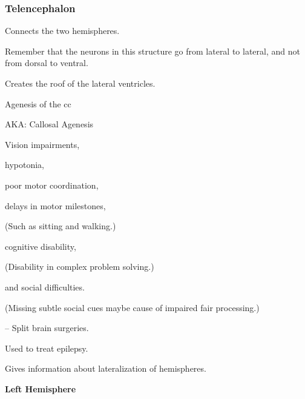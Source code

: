 \begin{coloredlist}
    \subsubsection{Telencephalon}
    \item {}
    \begin{coloredlist}
        \item Connects the two hemispheres.
        \item Remember that the neurons in this structure go from lateral to lateral, and not from dorsal to ventral.
        \item Creates the roof of the lateral ventricles.
        \item Agenesis of the cc
        \begin{coloredlist}
            \item AKA: Callosal Agenesis
            \item Vision impairments,
            \item hypotonia,
            \item poor motor coordination,
            \item delays in motor milestones,
            \begin{coloredlist}
                \item (Such as sitting and walking.)
            \end{coloredlist}
            \item cognitive disability,
            \begin{coloredlist}
                \item (Disability in complex problem solving.)
            \end{coloredlist}
            \item and social difficulties.
            \begin{coloredlist}
                \item (Missing subtle social cues maybe cause of impaired fair processing.)
            \end{coloredlist}
        \end{coloredlist}
        \item {} -- Split brain surgeries.
        \begin{coloredlist}
            \item Used to treat epilepsy.
            \item Gives information about lateralization of hemispheres.
            \item \textbf{Left Hemisphere}

\end{coloredlist}
\end{coloredlist}
\end{coloredlist}
